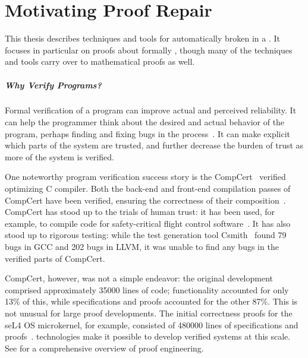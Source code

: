 \chapter{Motivating Proof Repair}
\label{chapt:mot}

This thesis describes techniques and tools for automatically  broken  in a .
It focuses in particular on proofs about formally  , though many of the techniques and tools carry over to mathematical proofs as well.

\paragraph{Why Verify Programs?}

Formal verification of a program can improve actual and perceived reliability.
It can help the programmer think about the desired and actual behavior of the program,
perhaps finding and fixing bugs in the process~\cite{murraybp}.
It can make explicit which parts of the system are trusted, and further decrease the burden
of trust as more of the system is verified.

One noteworthy program verification success story is the CompCert~\cite{Leroy:POPL06, Leroy2009} verified optimizing C compiler.
Both the back-end and front-end compilation passes
of CompCert have been verified, ensuring the correctness of their composition~\cite{Kaestner2017}.
CompCert has stood up to the trials of human trust: it has been used, for example, to compile code for safety-critical flight control software~\cite{Frana2011}.
It has also stood up to rigorous testing: while the test generation tool Csmith~\cite{Yang2011} found 
79 bugs in GCC and 202 bugs in LLVM, it was unable to find any bugs in the verified parts of CompCert.

CompCert, however, was not a simple endeavor: the original development comprised approximately 35000 lines of code;
functionality accounted for only 13\% of this, while specifications and proofs accounted for the other 87\%.
This is not unusual for large proof developments. The initial correctness proofs for the seL4 OS microkernel,
for example, consisted of 480000 lines of specifications and proofs~\cite{Klein2014micro}.
 technologies make it possible to develop verified systems at this scale.
See  for a comprehensive overview of proof engineering.

